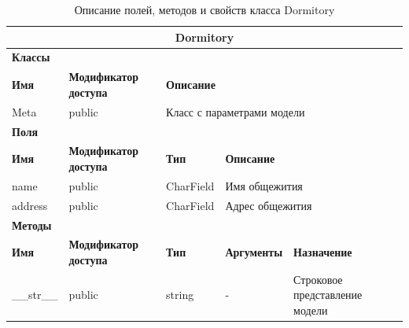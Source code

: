 \documentclass{../includes/TechDoc}
\begin{document}
    \begin{table}[ht]
        \caption{\label{tab:class-Dormitory-table}Описание полей, методов и свойств класса Dormitory}
        \centering
        \begin{tabular}{|p{3.2cm}|p{3cm}|p{2.9cm}|p{2.9cm}|p{4cm}|}
            \hline
            \multicolumn{5}{|c|}{Dormitory} \\ \hline
            \multicolumn{5}{|l|}{\textbf{Классы}} \\ \hline
            \textbf{Имя} & \textbf{Модификатор доступа} & \multicolumn{3}{p{9.8cm}|}{\textbf{Описание}} \\ \hline
            Meta & public & \multicolumn{3}{p{9.8cm}|}{Класс с параметрами модели} \\ \hline
            \multicolumn{5}{|l|}{\textbf{Поля}} \\ \hline
            \textbf{Имя} & \textbf{Модификатор доступа} & \textbf{Тип} & \multicolumn{2}{p{6.9cm}|}{\textbf{Описание}} \\ \hline
            name & public & CharField & \multicolumn{2}{p{6.9cm}|}{Имя общежития} \\ \hline
            address & public & CharField & \multicolumn{2}{p{6.9cm}|}{Адрес общежития} \\ \hline
            \multicolumn{5}{|l|}{\textbf{Методы}} \\ \hline
            \textbf{Имя} & \textbf{Модификатор доступа} & \textbf{Тип} & \textbf{Аргументы} & \textbf{Назначение} \\ \hline
            \_\_str\_\_ & public & string & - & Строковое представление модели \\ \hline
        \end{tabular}
    \end{table}
\end{document}
